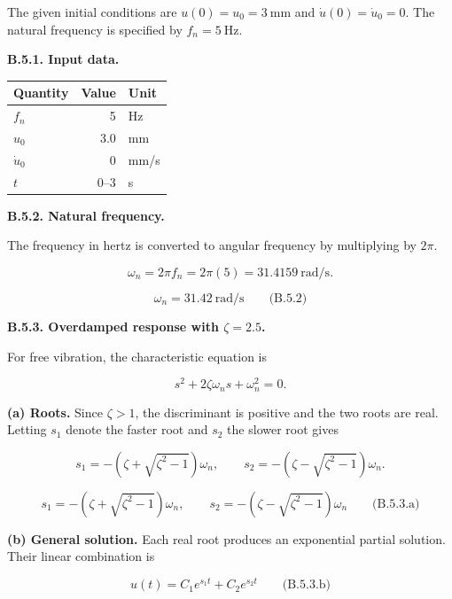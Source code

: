 \begingroup
\setlength{\abovedisplayskip}{6pt}
\setlength{\belowdisplayskip}{6pt}
\setlength{\abovedisplayshortskip}{4pt}
\setlength{\belowdisplayshortskip}{4pt}
\setlength{\intextsep}{6pt}

The given initial conditions are $u(0)=u_0=3\ \mathrm{mm}$ and $\dot{u}(0)=\dot{u}_0=0$. The natural frequency is specified by $f_n=5\ \mathrm{Hz}$.

\textbf{B.5.1. Input data.}

{ %
\begin{center}\small\begin{tabular}{@{}lrl@{}}
\toprule\noalign{}
Quantity & Value & Unit \\
\midrule\noalign{}
$f_n$ & 5 & Hz \\
$u_0$ & 3.0 & mm \\
$\dot{u}_0$ & 0 & mm/s \\
$t$ & $0$--$3$ & s \\
\bottomrule\end{tabular}\end{center}
}

\textbf{B.5.2. Natural frequency.}

The frequency in hertz is converted to angular frequency by multiplying by $2\pi$.

\[
\omega_n=2\pi f_n=2\pi(5)=31.4159\ \mathrm{rad/s}.
\]

\[
\boxed{\omega_n=31.42\ \mathrm{rad/s}}
\qquad\text{(B.5.2)}
\]

\textbf{B.5.3. Overdamped response with $\zeta=2.5$.}

For free vibration, the characteristic equation is

\[
s^2+2\zeta\omega_n s+\omega_n^2=0.
\]

\textbf{(a) Roots.} Since $\zeta>1$, the discriminant is positive and the two roots are real. Letting $s_1$ denote the faster root and $s_2$ the slower root gives

\[
s_1=-\left(\zeta+\sqrt{\zeta^2-1}\right)\omega_n,
\qquad
s_2=-\left(\zeta-\sqrt{\zeta^2-1}\right)\omega_n.
\]

\[
\boxed{
s_1=-\left(\zeta+\sqrt{\zeta^2-1}\right)\omega_n,
\qquad
s_2=-\left(\zeta-\sqrt{\zeta^2-1}\right)\omega_n
}
\qquad\text{(B.5.3.a)}
\]

\textbf{(b) General solution.} Each real root produces an exponential partial solution. Their linear combination is

\[
\boxed{u(t)=C_1e^{s_1t}+C_2e^{s_2t}}
\qquad\text{(B.5.3.b)}
\]

